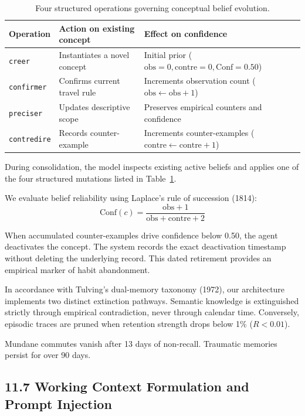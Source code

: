 \begin{table}[h]
\centering
\caption{Four structured operations governing conceptual belief evolution.}
\label{tab-concept_ops}
\small
\begin{tabular}{lll}
\toprule
\textbf{Operation} & \textbf{Action on existing concept} & \textbf{Effect on confidence} \\
\midrule
\texttt{creer} & Instantiates a novel concept & Initial prior ($\text{obs}=0, \text{contre}=0, \text{Conf}=0.50$) \\
\texttt{confirmer} & Confirms current travel rule & Increments observation count ($\text{obs} \leftarrow \text{obs} + 1$) \\
\texttt{preciser} & Updates descriptive scope & Preserves empirical counters and confidence \\
\texttt{contredire} & Records counter-example & Increments counter-examples ($\text{contre} \leftarrow \text{contre} + 1$) \\
\bottomrule
\end{tabular}
\end{table}

During consolidation, the model inspects existing active beliefs and applies one of the four structured mutations listed in Table~\ref{tab-concept_ops}.

We evaluate belief reliability using Laplace's rule of succession (1814):
\[\text{Conf}(c) = \frac{\text{obs} + 1}{\text{obs} + \text{contre} + 2}\]

When accumulated counter-examples drive confidence below 0.50, the agent deactivates the concept. The system records the exact deactivation timestamp without deleting the underlying record. This dated retirement provides an empirical marker of habit abandonment.

In accordance with Tulving's dual-memory taxonomy (1972), our architecture implements two distinct extinction pathways. Semantic knowledge is extinguished strictly through empirical contradiction, never through calendar time. Conversely, episodic traces are pruned when retention strength drops below 1\% ($R < 0.01$).

Mundane commutes vanish after 13 days of non-recall. Traumatic memories persist for over 90 days.

\subsection{11.7 Working Context Formulation and Prompt Injection}

